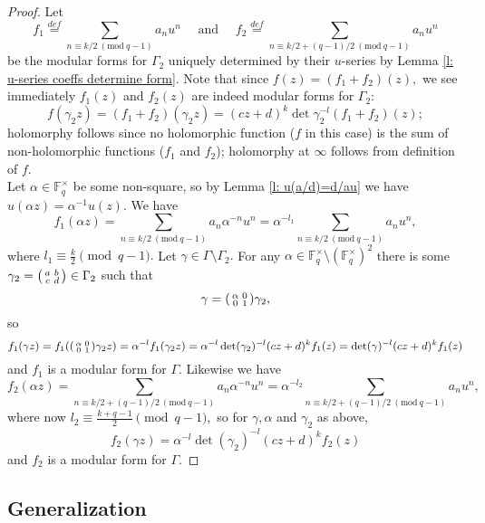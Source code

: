\documentclass[11pt]{amsart}
\theoremstyle{definition}
\newenvironment{psmallmatrix}
{\left(\begin{smallmatrix}}
	{\end{smallmatrix}\right)}
\numberwithin{equation}{section}
\newcommand{\bbF}{\mathbb{F}}		%
\newcommand{\Mod}[1]{\ (\mathrm{mod}\ #1)}
\begin{document}
\begin{proof}
Let \[f_1\overset{def}{=}\sum_{n\equiv k/2\Mod{q-1}}a_nu^n\quad \text{ and }\quad f_2\overset{def}{=}\sum_{n\equiv k/2+(q-1)/2\Mod{q-1}} a_nu^n\] be the modular forms for $\Gamma_2$ uniquely determined by their $u$-series by Lemma \ref{l: u-series coeffs determine form}. Note that since $f(z)=(f_1+f_2)(z),$ we see immediately $f_1(z)$ and $f_2(z)$ are indeed modular forms for $\Gamma_2$: \[f(\gamma_2z)=(f_1+f_2)(\gamma_2 z)=(cz+d)^k\det\gamma_2^{-l}(f_1+f_2)(z);\] holomorphy follows since no holomorphic function ($f$ in this case) is the sum of non-holomorphic functions ($f_1$ and $f_2$); holomorphy at $\infty$ follows from definition of $f$.\\

Let $\alpha\in \bbF_q^{\times}$ be some non-square, so by Lemma \ref{l: u(a/d)=d/au} we have $u(\alpha z)=\alpha^{-1}u(z).$ We have \[f_1(\alpha z)=\sum_{n\equiv k/2\Mod{q-1}}a_n\alpha^{-n}u^n=\alpha^{-l_1}\sum_{n\equiv k/2\Mod{q-1}}a_nu^n,\] where $\displaystyle{l_1\equiv \frac{k}{2}\pmod{q-1}}.$ Let $\gamma\in \Gamma\setminus \Gamma_2.$ For any $\alpha\in \bbF_q^{\times}\setminus(\bbF_q^{\times})^2$ there is some $\displaystyle{\gamma_2=\begin{psmallmatrix}a&b\\c&d\end{psmallmatrix}\in \Gamma_2}$ such that \[\gamma=\begin{psmallmatrix}\alpha&0\\0&1\end{psmallmatrix}\gamma_2,\] so 
\[f_1(\gamma z)=f_1(\begin{psmallmatrix}\alpha&0\\0&1\end{psmallmatrix}\gamma_2 z)=\alpha^{-l}f_1(\gamma_2 z)=\alpha^{-l}\det(\gamma_2)^{-l}(cz+d)^kf_1(z)=\det(\gamma)^{-l}(cz+d)^kf_1(z)\] and $f_1$ is a modular form for $\Gamma.$ Likewise we have 
\[f_2(\alpha z)=\sum_{n\equiv k/2+(q-1)/2\Mod{q-1}} a_n\alpha^{-n}u^n=\alpha^{-l_2}\sum_{n\equiv k/2+(q-1)/2\Mod{q-1}} a_nu^n,\]
where now $\displaystyle{l_2\equiv \frac{k+q-1}{2}}\pmod{q-1},$ so for $\gamma,\alpha$ and $\gamma_2$ as above,
\[f_2(\gamma z)=\alpha^{-l}\det(\gamma_2)^{-l}(cz+d)^kf_2(z)\] and $f_2$ is a modular form for $\Gamma.$
\end{proof}


\subsection{Generalization}
\end{document}
